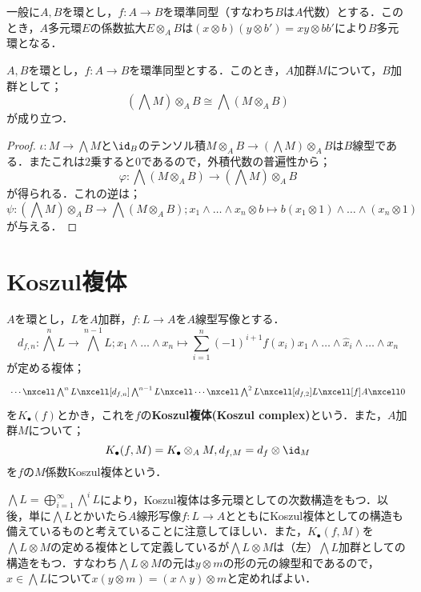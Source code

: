 一般に$A,B$を環とし，$f:A\to B$を環準同型（すなわち$B$は$A$代数）とする．このとき，$A$多元環$E$の係数拡大$E\otimes_A B$は$(x\otimes b)(y\otimes b')=xy\otimes bb'$により$B$多元環となる．
\begin{prop}[係数環の拡大]
	$A,B$を環とし，$f:A\to B$を環準同型とする．このとき，$A$加群$M$について，$B$加群として；
	\[(\bigwedge M)\otimes_A B\cong\bigwedge(M\otimes_A B)\]
	が成り立つ．
\end{prop}

\begin{proof}
	$\iota:M\to\bigwedge M$と$\id_B$のテンソル積$M\otimes_A B\to(\bigwedge M)\otimes_A B$は$B$線型である．またこれは$2$乗すると$0$であるので，外積代数の普遍性から；
	\[\varphi:\bigwedge(M\otimes_A B)\to(\bigwedge M)\otimes_
	A B\]
	が得られる．これの逆は；
	\[\psi:(\bigwedge M)\otimes_A B\to\bigwedge(M\otimes_A B);x_1\wedge\dots\wedge x_n\otimes b\mapsto b(x_1\otimes 1)\wedge\dots\wedge(x_n\otimes1)\]
	が与える．
\end{proof}
\section{Koszul複体}

\begin{defi}[Koszul複体]
	$A$を環とし，$L$を$A$加群，$f:L\to A$を$A$線型写像とする．
	\[d_{f,n}:\bigwedge^n L\to\bigwedge^{n-1}L;x_1\wedge\dots\wedge x_n\mapsto\sum_{i=1}^n(-1)^{i+1}f(x_i)x_1\wedge\dots\wedge\widehat{x}_i\wedge\dots\wedge x_n\]
	が定める複体；
	\[\begin{tikzcd}
	\cdots\nxcell\bigwedge^n L\nxcell[d_{f,n}]\bigwedge^{n-1}L\nxcell\cdots\nxcell\bigwedge^2 L\nxcell[d_{f,2}]L\nxcell[f]A\nxcell0
	\end{tikzcd}\]
	を$K_\bullet(f)$とかき，これを$f$の\textbf{Koszul複体(Koszul complex)}という．また，$A$加群$M$について；
	\[K_\bullet(f,M)=K_\bullet\otimes_A M, d_{f,M}=d_f\otimes\id_M\]
	を$f$の$M$係数Koszul複体という．
\end{defi}
$\bigwedge L=\bigoplus_{i=1}^\infty\bigwedge^i L$により，Koszul複体は多元環としての次数構造をもつ．以後，単に$\bigwedge L$とかいたら$A$線形写像$f:L\to A$とともにKoszul複体としての構造も備えているものと考えていることに注意してほしい．また，$K_\bullet(f,M)$を$\bigwedge L\otimes M$の定める複体として定義しているが$\bigwedge L\otimes M$は（左）$\bigwedge L$加群としての構造をもつ．すなわち$\bigwedge L\otimes M$の元は$y\otimes m$の形の元の線型和であるので，$x\in\bigwedge L$について$x(y\otimes m)=(x\wedge y)\otimes m$と定めればよい．

